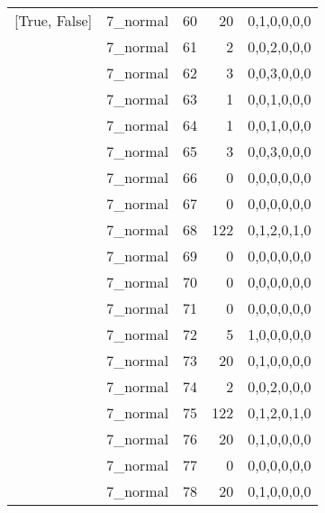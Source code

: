 \begin{tabular}{llrrl}
 [True, False]   & 7\_normal            &            60 &                    20 & 0,1,0,0,0,0   \\
 [True, False]   & 7\_normal            &            61 &                     2 & 0,0,2,0,0,0   \\
 [True, False]   & 7\_normal            &            62 &                     3 & 0,0,3,0,0,0   \\
 [True, False]   & 7\_normal            &            63 &                     1 & 0,0,1,0,0,0   \\
 [True, False]   & 7\_normal            &            64 &                     1 & 0,0,1,0,0,0   \\
 [True, False]   & 7\_normal            &            65 &                     3 & 0,0,3,0,0,0   \\
 [True, False]   & 7\_normal            &            66 &                     0 & 0,0,0,0,0,0   \\
 [True, False]   & 7\_normal            &            67 &                     0 & 0,0,0,0,0,0   \\
 [True, False]   & 7\_normal            &            68 &                   122 & 0,1,2,0,1,0   \\
 [True, False]   & 7\_normal            &            69 &                     0 & 0,0,0,0,0,0   \\
 [True, False]   & 7\_normal            &            70 &                     0 & 0,0,0,0,0,0   \\
 [True, False]   & 7\_normal            &            71 &                     0 & 0,0,0,0,0,0   \\
 [True, False]   & 7\_normal            &            72 &                     5 & 1,0,0,0,0,0   \\
 [True, False]   & 7\_normal            &            73 &                    20 & 0,1,0,0,0,0   \\
 [True, False]   & 7\_normal            &            74 &                     2 & 0,0,2,0,0,0   \\
 [True, False]   & 7\_normal            &            75 &                   122 & 0,1,2,0,1,0   \\
 [True, False]   & 7\_normal            &            76 &                    20 & 0,1,0,0,0,0   \\
 [True, False]   & 7\_normal            &            77 &                     0 & 0,0,0,0,0,0   \\
 [True, False]   & 7\_normal            &            78 &                    20 & 0,1,0,0,0,0   \\

\end{tabular}
